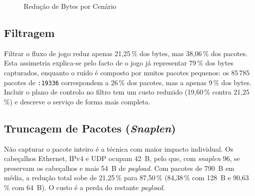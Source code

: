 \documentclass[11pt, a4paper]{article}
\begin{document}
\begin{figure}[hbt!]
\centering
{}
\caption{Redução de Bytes por Cenário}
\label{fig:red}
\end{figure}

\subsection{Filtragem}
Filtrar o fluxo de jogo reduz apenas 21,25\,\% dos bytes, mas 38,06\,\% dos pacotes. Esta assimetria explica-se pelo facto de o jogo já representar 79\,\% dos bytes capturados, enquanto o ruído é composto por muitos pacotes pequenos: os 85\,785 pacotes de \texttt{:19336} correspondem a 26\,\% dos pacotes, mas a apenas 9\,\% dos bytes. Incluir o plano de controlo no filtro tem um custo reduzido (19,60\,\% contra 21,25\,\%) e descreve o serviço de forma mais completa.

\subsection{Truncagem de Pacotes (\textit{Snaplen})}
Não capturar o pacote inteiro é a técnica com maior impacto individual. Os cabeçalhos Ethernet, IPv4 e UDP ocupam 42~B, pelo que, com \textit{snaplen} 96, se preservam os cabeçalhos e mais 54~B de \textit{payload}. Com pacotes de 790~B em média, a redução total sobe de 21,25\,\% para 87,50\,\% (84,38\,\% com 128~B e 90,63\,\% com 64~B). O custo é a perda do restante \textit{payload}.
\end{document}
